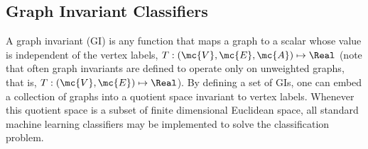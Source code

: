 \documentclass[10pt,journal,cspaper,compsoc]{IEEEtran}
\begin{document}
\subsection{Graph Invariant Classifiers} %
\label{sub:graph_invariants}

A graph invariant (GI) is any function that maps a graph to a scalar whose value is independent of the vertex labels, $T: (\mc{V},\mc{E},\mc{A}) \mapsto \Real$ (note that often graph invariants are defined to operate only on unweighted graphs, that is, $T: (\mc{V},\mc{E}) \mapsto \Real$).  By defining a set of GIs, one can embed a collection of graphs into a quotient space invariant to vertex labels.  Whenever this quotient space is a subset of finite dimensional Euclidean space, all standard machine learning classifiers may be implemented to solve the classification problem.  
\end{document}
